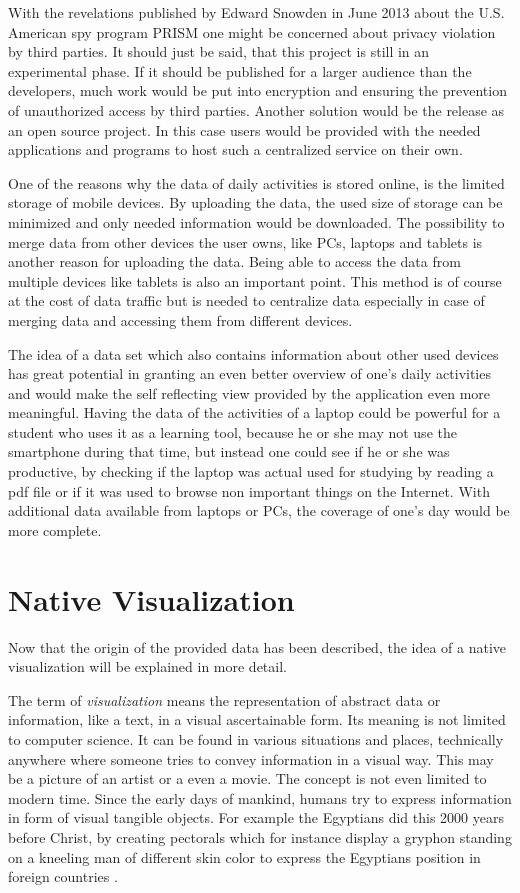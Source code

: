 With  the revelations published by Edward Snowden in June 2013 about the U.S. American spy program PRISM one might be concerned about privacy violation by third parties. It should just be said, that this project is still in an experimental phase. If it should be published for a larger audience than the developers, much work would be put into encryption and ensuring the prevention of unauthorized access by third parties. Another solution would be the release as an open source project. In this case users would be provided with the needed applications and programs to host such a centralized service on their own.

One  of the reasons why the data of daily activities is stored online, is the limited storage of mobile devices. By uploading the data, the used size of storage can be minimized and only needed information would be downloaded. The possibility to merge data from other devices the user owns, like PCs, laptops and tablets is another reason for uploading the data. Being able to access the data from multiple devices like tablets is also an important point. This method is of course at the cost of data traffic but is needed to centralize data especially in case of merging data and accessing them from different devices.

The idea of a data set which also contains information about other used devices has great potential in granting an even better overview of one's daily activities and would make the self reflecting view provided by the application even more meaningful. Having the data of the activities of a laptop could be powerful for a student who uses it as a learning tool, because he or she may not use the smartphone during that time, but instead one could see if he or she was productive, by checking if the laptop was actual used for studying by reading a pdf file or if it was used to browse non important things on the Internet. With additional data available from laptops or PCs, the coverage of one's day would be more complete.
\section{Native Visualization}
Now that the origin of the provided data has been described, the idea of a native visualization will be explained in more detail.

The  term of \emph{visualization} means the representation of abstract data or information, like a text, in a visual ascertainable form. Its meaning is not limited to computer science. It can be found in various situations and places, technically anywhere where someone tries to convey information in a visual way. This may be a picture of an artist or a even a movie. The concept is not even limited to modern time. Since the early days of mankind, humans try to express information in form of visual tangible objects. For example the Egyptians did this 2000 years before Christ, by creating pectorals which for instance display a gryphon standing on a kneeling man of different skin color to express the Egyptians position in foreign countries \cite{sarahhallersthesis}.


